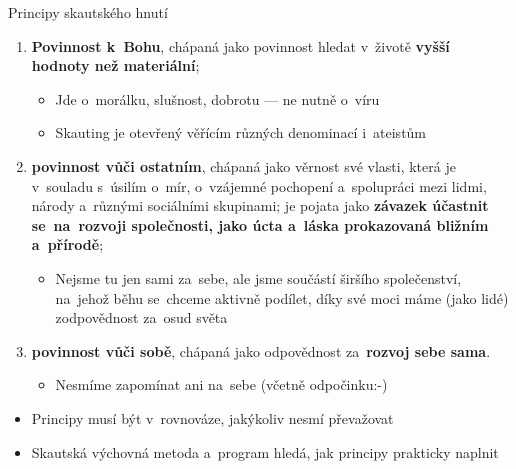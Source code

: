 \documentclass[compress, ucs, xelatex, 11pt, xcolor=dvipsnames, print, aspectratio=169,
	hyperref={
		bookmarks=true,
		unicode=true,
		colorlinks=true,
		pdftitle={Skautska vychovna metoda},
		plainpages=false,
		pdfauthor={Vojtech Zeisek},
		pdfsubject={Skautska vychovna metoda a jeji vyvoj za posledni stoleti a desetileti},
		pdfcreator={XeLaTeX},
		pdfkeywords={Junak, Pedagogika, Skaut, Skauting, Vychovna metoda},
		linkcolor=Red, %
		anchorcolor=ForestGreen, %
		citecolor=ForestGreen, %
		filecolor=ForestGreen, %
		menucolor=ForestGreen, %
		urlcolor=Sepia, %
		pdftex},
	url={hyphens, lowtilde} %
	]{beamer}
\begin{document}
\begin{frame}{Principy skautského hnutí}
	\begin{enumerate}
		\item \textbf{Povinnost k~Bohu}, chápaná jako povinnost hledat v~životě \textbf{vyšší hodnoty než materiální};
		\begin{itemize}
			\item Jde o~morálku, slušnost, dobrotu --- ne nutně o~víru
			\item Skauting je otevřený věřícím různých denominací i~ateistům
		\end{itemize}
		\item \textbf{povinnost vůči ostatním}, chápaná jako věrnost své vlasti, která je v~souladu s~úsilím o~mír, o~vzájemné pochopení a~spolupráci mezi lidmi, národy a~různými sociálními skupinami; je pojata jako \textbf{závazek účastnit se~na~rozvoji společnosti, jako úcta a~láska prokazovaná bližním a~přírodě};
		\begin{itemize}
			\item Nejsme tu jen sami za~sebe, ale jsme součástí širšího společenství, na~jehož běhu se~chceme aktivně podílet, díky své moci máme (jako lidé) zodpovědnost za~osud světa
		\end{itemize}
		\item \textbf{povinnost vůči sobě}, chápaná jako odpovědnost za~\textbf{rozvoj sebe sama}.
		\begin{itemize}
			\item Nesmíme zapomínat ani na~sebe (včetně odpočinku:-)
		\end{itemize}
	\end{enumerate}
	\vfill
	\begin{itemize}
		\item Principy musí být v~rovnováze, jakýkoliv nesmí převažovat
		\item Skautská výchovná metoda a~program hledá, jak principy prakticky naplnit
	\end{itemize}
\end{frame}
\end{document}
